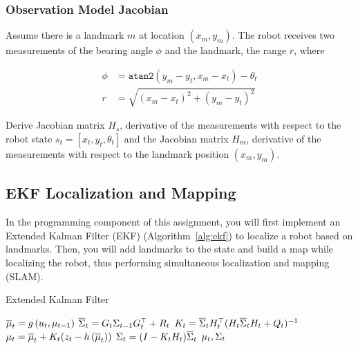 \documentclass[tp]{lcc}
\begin{document}
\subsubsection{Observation Model Jacobian}
Assume there is a landmark $m$ at location $(x_{m},y_{m})$. The robot receives two measurements of the bearing angle $\phi$ and the landmark, the range $r$, where

\begin{align*}
    \phi &= \texttt{atan2}(y_{m}-y_{t},x_{m}-x_{t})-\theta_{t} \\
    r &= \sqrt{(x_{m}-x_{t})^{2}+(y_{m}-y_{t})^{2}}
\end{align*}

Derive Jacobian matrix $H_{s}$, derivative of the measurements with respect to the robot state $s_{t}=[x_{t},y_{t},\theta_{t}]$ and the Jacobian matrix $H_{m}$, derivative of the measurements with respect to the landmark position $(x_{m},y_{m})$.

\subsection{EKF Localization and Mapping}
In the programming component of this assignment, you will first implement an Extended Kalman Filter (EKF) (Algorithm~\ref{alg:ekf}) to localize a robot based on landmarks. Then, you will add landmarks to the state and build a map while localizing the robot, thus performing simultaneous localization and mapping (SLAM).

\begin{algorithm}
    \label{alg:ekf}
    \caption{Extended Kalman Filter}
    \begin{algorithmic}[1]
            \State $\overline{\mu}_{t} = g\left( u_{t}, \mu_{t-1} \right)$
            \State $\overline{\Sigma}_{t} = G_{t} \Sigma_{t-1} G_{t}^{\top}+R_{t}$
            \Statex
            \State $K_{t} = \overline{\Sigma}_{t} H_{t}^{\top} (H_{t} \overline{\Sigma}_{t}  H_{t} + Q_{t})^{-1} $
            \State $\mu_{t} = \overline{\mu}_{t} + K_{t} (z_{t} - h\left( \overline{\mu}_{t} \right))$
            \State $\Sigma_{t} =  (I - K_{t} H_{t}) \overline{\Sigma}_{t}$
            \State \Return $\mu_{t}, \Sigma_{t}$
        \EndProcedure
    \end{algorithmic}
\end{algorithm}
\end{document}
